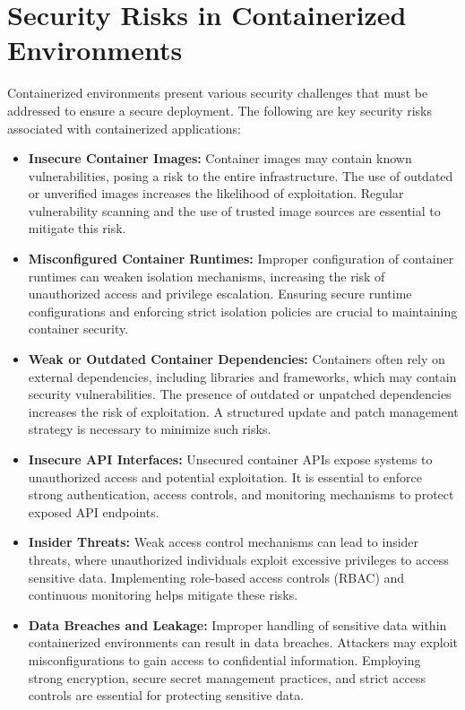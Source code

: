 \documentclass[12pt,a4paper]{report}
\begin{document}
\section{Security Risks in Containerized Environments}

Containerized environments present various security challenges that must be addressed to ensure a secure deployment. The following are key security risks associated with containerized applications:

\begin{itemize}
    \item \textbf{Insecure Container Images:}  
    Container images may contain known vulnerabilities, posing a risk to the entire infrastructure. The use of outdated or unverified images increases the likelihood of exploitation. Regular vulnerability scanning and the use of trusted image sources are essential to mitigate this risk.

    \item \textbf{Misconfigured Container Runtimes:}  
    Improper configuration of container runtimes can weaken isolation mechanisms, increasing the risk of unauthorized access and privilege escalation. Ensuring secure runtime configurations and enforcing strict isolation policies are crucial to maintaining container security.

    \item \textbf{Weak or Outdated Container Dependencies:}  
    Containers often rely on external dependencies, including libraries and frameworks, which may contain security vulnerabilities. The presence of outdated or unpatched dependencies increases the risk of exploitation. A structured update and patch management strategy is necessary to minimize such risks.

    \item \textbf{Insecure API Interfaces:}  
    Unsecured container APIs expose systems to unauthorized access and potential exploitation. It is essential to enforce strong authentication, access controls, and monitoring mechanisms to protect exposed API endpoints.

    \item \textbf{Insider Threats:}  
    Weak access control mechanisms can lead to insider threats, where unauthorized individuals exploit excessive privileges to access sensitive data. Implementing role-based access controls (RBAC) and continuous monitoring helps mitigate these risks.

    \item \textbf{Data Breaches and Leakage:}  
    Improper handling of sensitive data within containerized environments can result in data breaches. Attackers may exploit misconfigurations to gain access to confidential information. Employing strong encryption, secure secret management practices, and strict access controls are essential for protecting sensitive data.


\end{itemize}
\end{document}
